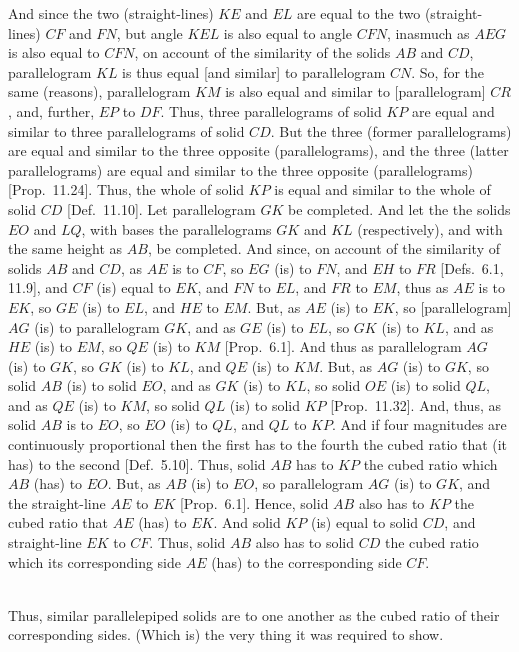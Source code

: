 \begin{Parallel}{}{}
{And since the two (straight-lines) $KE$ and $EL$ are equal to the
two (straight-lines) $CF$ and $FN$, but angle $KEL$ is also
equal to angle $CFN$, inasmuch as $AEG$ is also equal to $CFN$,
on account of the similarity of the solids $AB$ and $CD$, parallelogram
$KL$ is thus equal [and similar] to parallelogram $CN$. So,
for the same (reasons), parallelogram $KM$ is also  equal and similar to
[parallelogram] $CR$, and, further, $EP$ to $DF$. Thus,
three parallelograms of solid $KP$ are equal and similar to three
parallelograms of solid $CD$. But the three (former parallelograms) are equal and
similar to the three opposite (parallelograms), and the three (latter parallelograms)
are equal and similar to the three opposite (parallelograms) 
[Prop.~11.24]. Thus, the whole of solid $KP$
is equal and similar to the whole of solid $CD$ [Def.~11.10]. Let parallelogram $GK$ be completed. And
let the the solids $EO$ and $LQ$, with bases the parallelograms
$GK$ and $KL$ (respectively), and with the same height as $AB$, be completed. And since, on account of the similarity of solids $AB$ and $CD$, 
as $AE$ is to $CF$, so $EG$ (is) to $FN$,  and $EH$  to $FR$ [Defs.~6.1, 11.9],
and $CF$ (is) equal to $EK$, and $FN$ to $EL$, and $FR$ to $EM$, 
thus as $AE$ is to $EK$, so $GE$ (is) to $EL$, and $HE$ to $EM$. But,
as $AE$ (is) to $EK$, so [parallelogram] $AG$ (is) to parallelogram
$GK$, and as $GE$ (is) to $EL$, so $GK$ (is) to $KL$,
and as $HE$ (is) to $EM$, so $QE$ (is) to $KM$ [Prop.~6.1]. And thus as parallelogram $AG$ (is) to $GK$, so $GK$
(is) to $KL$, and $QE$ (is) to $KM$. But, as $AG$
(is) to $GK$, so solid $AB$ (is) to solid $EO$, and as $GK$ (is) to $KL$,
so solid $OE$ (is) to  solid $QL$, and as $QE$ (is) to $KM$, so solid
$QL$ (is) to solid $KP$ [Prop.~11.32].
And, thus, as solid $AB$ is to $EO$, so $EO$ (is) to $QL$, and
$QL$ to $KP$.
And if four magnitudes are continuously proportional then the first has to
the fourth the cubed ratio that (it has) to the second [Def.~5.10].  Thus, solid $AB$ has to $KP$ the 
cubed ratio
which $AB$ (has) to $EO$. 
But, as $AB$ (is) to $EO$, so parallelogram $AG$
(is) to $GK$, and the straight-line $AE$ to $EK$ [Prop.~6.1]. Hence, 
solid $AB$ also has to $KP$ the cubed ratio  that $AE$ (has) to
$EK$. And solid $KP$ (is) equal to solid $CD$, and straight-line $EK$ to
$CF$.  Thus, solid $AB$ also has to solid $CD$ the cubed ratio
which its corresponding side $AE$ (has) to the corresponding side
$CF$.\\~\\

\epsfysize=2.5in
\centerline{}

Thus, similar parallelepiped solids are to one another
as the cubed ratio of  their corresponding sides. (Which is) the very thing it
was required to show.}
\end{Parallel}

